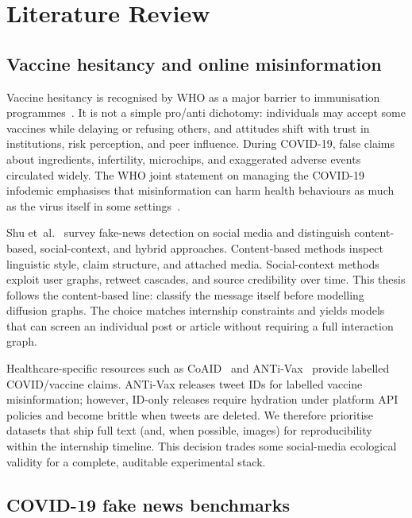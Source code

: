 \documentclass[12pt, a4paper]{report}
\begin{document}
\section{Literature Review}
\label{sec:literature-review}

\subsection{Vaccine hesitancy and online misinformation}

Vaccine hesitancy is recognised by WHO as a major barrier to immunisation programmes~\cite{macdonald2015hesitancy}.
It is not a simple pro/anti dichotomy: individuals may accept some vaccines while delaying or refusing others, and attitudes shift with trust in institutions, risk perception, and peer influence.
During COVID-19, false claims about ingredients, infertility, microchips, and exaggerated adverse events circulated widely.
The WHO joint statement on managing the COVID-19 infodemic emphasises that misinformation can harm health behaviours as much as the virus itself in some settings~\cite{who2020infodemic}.

Shu et~al.~\cite{shu2017fake} survey fake-news detection on social media and distinguish content-based, social-context, and hybrid approaches.
Content-based methods inspect linguistic style, claim structure, and attached media.
Social-context methods exploit user graphs, retweet cascades, and source credibility over time.
This thesis follows the content-based line: classify the message itself before modelling diffusion graphs.
The choice matches internship constraints and yields models that can screen an individual post or article without requiring a full interaction graph.

Healthcare-specific resources such as CoAID~\cite{cui2020coaid} and ANTi-Vax~\cite{hayawi2022antivax} provide labelled COVID/vaccine claims.
ANTi-Vax releases tweet IDs for labelled vaccine misinformation; however, ID-only releases require hydration under platform API policies and become brittle when tweets are deleted.
We therefore prioritise datasets that ship full text (and, when possible, images) for reproducibility within the internship timeline.
This decision trades some social-media ecological validity for a complete, auditable experimental stack.

\subsection{COVID-19 fake news benchmarks}
\end{document}
